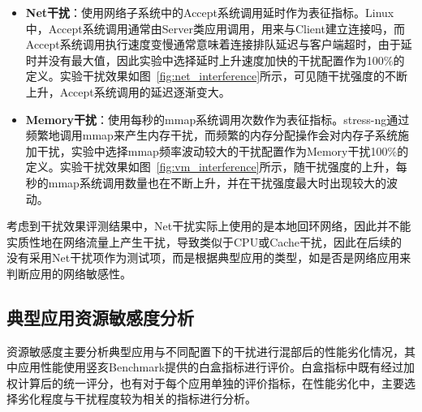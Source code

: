 \begin{itemize}
    \item \textbf{Net干扰}：使用网络子系统中的Accept系统调用延时作为表征指标。Linux中，Accept系统调用通常由Server类应用调用，用来与Client建立连接吗，而Accept系统调用执行速度变慢通常意味着连接排队延迟与客户端超时，由于延时并没有最大值，因此实验中选择延时上升速度加快的干扰配置作为100\%的定义。实验干扰效果如图~\ref{fig:net_interference}所示，可见随干扰强度的不断上升，Accept系统调用的延迟逐渐变大。
    
    \item \textbf{Memory干扰}：使用每秒的mmap系统调用次数作为表征指标。stress-ng通过频繁地调用mmap来产生内存干扰，而频繁的内存分配操作会对内存子系统施加干扰，实验中选择mmap频率波动较大的干扰配置作为Memory干扰100\%的定义。实验干扰效果如图~\ref{fig:vm_interference}所示，随干扰强度的上升，每秒的mmap系统调用数量也在不断上升，并在干扰强度最大时出现较大的波动。
\end{itemize}

考虑到干扰效果评测结果中，Net干扰实际上使用的是本地回环网络，因此并不能实质性地在网络流量上产生干扰，导致类似于CPU或Cache干扰，因此在后续的
没有采用Net干扰项作为测试项，而是根据典型应用的类型，如是否是网络应用来判断应用的网络敏感性。

\subsection{典型应用资源敏感度分析}

资源敏感度主要分析典型应用与不同配置下的干扰进行混部后的性能劣化情况，其中应用性能使用竖亥Benchmark提供的白盒指标进行评价。白盒指标中既有经过加权计算后的统一评分，也有对于每个应用单独的评价指标，在性能劣化中，主要选择劣化程度与干扰程度较为相关的指标进行分析。

